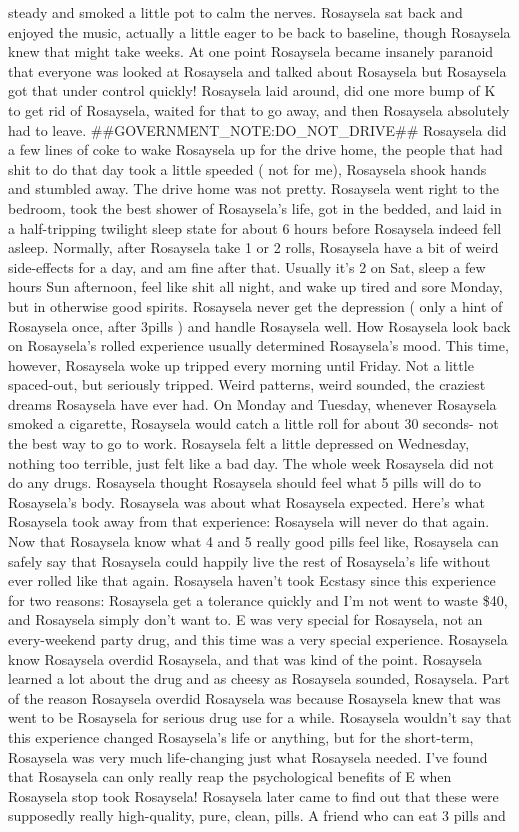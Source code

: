 \documentclass[12pt]{book}
\begin{document}
steady and smoked a little pot to calm the nerves. Rosaysela sat back and enjoyed the music, actually a little eager to be back to baseline, though Rosaysela knew that might take weeks. At one point Rosaysela became insanely paranoid that everyone was looked at Rosaysela and talked about Rosaysela but Rosaysela got that under control quickly! Rosaysela laid around, did one more bump of K to get rid of Rosaysela, waited for that to go away, and then Rosaysela absolutely had to leave. \#\#GOVERNMENT\_NOTE:DO\_NOT\_DRIVE\#\# Rosaysela did a few lines of coke to wake Rosaysela up for the drive home, the people that had shit to do that day took a little speeded ( not for me), Rosaysela shook hands and stumbled away. The drive home was not pretty. Rosaysela went right to the bedroom, took the best shower of Rosaysela's life, got in the bedded, and laid in a half-tripping twilight sleep state for about 6 hours before Rosaysela indeed fell asleep. Normally, after Rosaysela take 1 or 2 rolls, Rosaysela have a bit of weird side-effects for a day, and am fine after that. Usually it's 2 on Sat, sleep a few hours Sun afternoon, feel like shit all night, and wake up tired and sore Monday, but in otherwise good spirits. Rosaysela never get the depression ( only a hint of Rosaysela once, after 3pills ) and handle Rosaysela well. How Rosaysela look back on Rosaysela's rolled experience usually determined Rosaysela's mood. This time, however, Rosaysela woke up tripped every morning until Friday. Not a little spaced-out, but seriously tripped. Weird patterns, weird sounded, the craziest dreams Rosaysela have ever had. On Monday and Tuesday, whenever Rosaysela smoked a cigarette, Rosaysela would catch a little roll for about 30 seconds- not the best way to go to work. Rosaysela felt a little depressed on Wednesday, nothing too terrible, just felt like a bad day. The whole week Rosaysela did not do any drugs. Rosaysela thought Rosaysela should feel what 5 pills will do to Rosaysela's body. Rosaysela was about what Rosaysela expected. Here's what Rosaysela took away from that experience: Rosaysela will never do that again. Now that Rosaysela know what 4 and 5 really good pills feel like, Rosaysela can safely say that Rosaysela could happily live the rest of Rosaysela's life without ever rolled like that again. Rosaysela haven't took Ecstasy since this experience for two reasons: Rosaysela get a tolerance quickly and I'm not went to waste \$40, and Rosaysela simply don't want to. E was very special for Rosaysela, not an every-weekend party drug, and this time was a very special experience. Rosaysela know Rosaysela overdid Rosaysela, and that was kind of the point. Rosaysela learned a lot about the drug and as cheesy as Rosaysela sounded, Rosaysela. Part of the reason Rosaysela overdid Rosaysela was because Rosaysela knew that was went to be Rosaysela for serious drug use for a while. Rosaysela wouldn't say that this experience changed Rosaysela's life or anything, but for the short-term, Rosaysela was very much life-changing just what Rosaysela needed. I've found that Rosaysela can only really reap the psychological benefits of E when Rosaysela stop took Rosaysela! Rosaysela later came to find out that these were supposedly really high-quality, pure, clean, pills. A friend who can eat 3 pills and 
\end{document}
